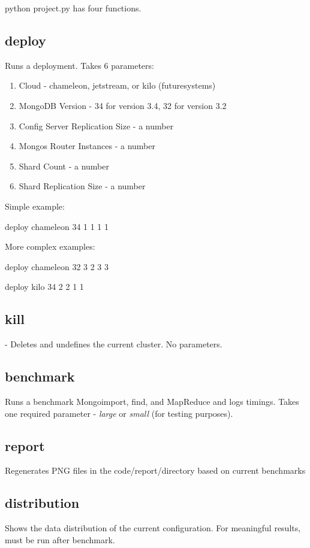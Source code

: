 \documentclass[9pt,twocolumn,twoside]{../../styles/osajnl}
\begin{document}
python project.py has four functions.

\subsection{deploy} Runs a deployment.  Takes 6 parameters:


\begin{enumerate}

\item Cloud - chameleon, jetstream, or kilo (futuresystems)
\item MongoDB Version - 34 for version 3.4, 32 for version 3.2
\item Config Server Replication Size - a number
\item Mongos Router Instances - a number
\item Shard Count - a number
\item Shard Replication Size - a number


\end{enumerate}

Simple example:

deploy chameleon 34 1 1 1 1

More complex examples: 

deploy chameleon 32 3 2 3 3

deploy kilo 34 2 2 1 1


\subsection{kill} - Deletes and undefines the current cluster.  No parameters.

\subsection{benchmark} Runs a benchmark Mongoimport, find, and MapReduce and logs timings.  Takes one required parameter - \emph{large} or \emph{small} (for testing purposes).

\subsection{report}  Regenerates PNG files in the code/report/directory based on current benchmarks

\subsection{distribution} Shows the data distribution of the current configuration.  For meaningful results, must be run after benchmark.  
\end{document}
